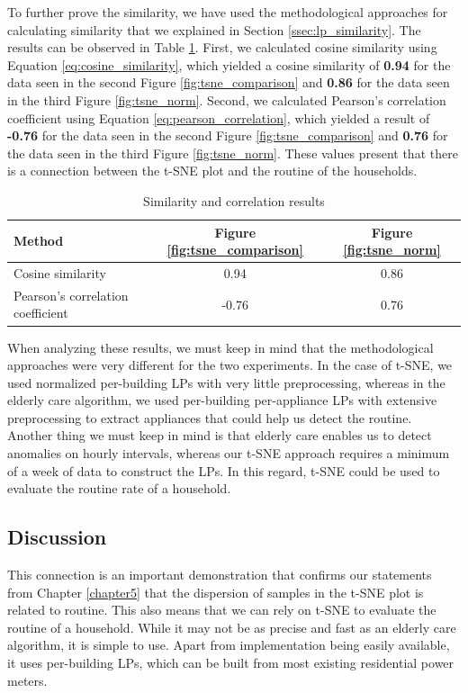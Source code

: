 To further prove the similarity, we have used the methodological approaches for calculating similarity that we explained in Section \ref{ssec:lp_similarity}.
The results can be observed in Table \ref{tab:similarity_results}.
First, we calculated cosine similarity using Equation \ref{eq:cosine_similarity}, which yielded a cosine similarity of \textbf{0.94} for the data seen in the second Figure \ref{fig:tsne_comparison} and \textbf{0.86} for the data seen in the third Figure \ref{fig:tsne_norm}.
Second, we calculated Pearson's correlation coefficient using Equation \ref{eq:pearson_correlation}, which yielded a result of \textbf{-0.76} for the data seen in the second Figure \ref{fig:tsne_comparison} and \textbf{0.76} for the data seen in the third Figure \ref{fig:tsne_norm}.
These values present that there is a connection between the t-SNE plot and the routine of the households.

\begin{table}[ht]
    \centering
    \caption{Similarity and correlation results}
    \label{tab:similarity_results}
    \begin{tabular}{@{}lcc@{}}
    \toprule
    \textbf{Method} & \textbf{Figure \ref{fig:tsne_comparison}} & \textbf{Figure \ref{fig:tsne_norm}} \\ \midrule
    Cosine similarity & 0.94 & 0.86 \\
    Pearson's correlation coefficient & -0.76 & 0.76 \\ \bottomrule
    \end{tabular}
\end{table}

When analyzing these results, we must keep in mind that the methodological approaches were very different for the two experiments.
In the case of t-SNE, we used normalized per-building LPs with very little preprocessing, whereas in the elderly care algorithm, we used per-building per-appliance LPs with extensive preprocessing to extract appliances that could help us detect the routine.
Another thing we must keep in mind is that elderly care enables us to detect anomalies on hourly intervals, whereas our t-SNE approach requires a minimum of a week of data to construct the LPs.
In this regard, t-SNE could be used to evaluate the routine rate of a household.

\subsection{Discussion}
This connection is an important demonstration that confirms our statements from Chapter \ref{chapter5} that the dispersion of samples in the t-SNE plot is related to routine.
This also means that we can rely on t-SNE to evaluate the routine of a household.
While it may not be as precise and fast as an elderly care algorithm, it is simple to use.
Apart from implementation being easily available, it uses per-building LPs, which can be built from most existing residential power meters.

